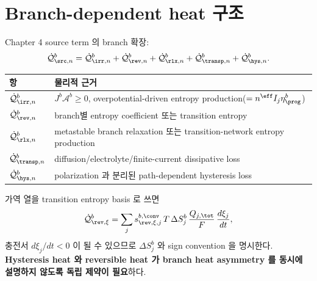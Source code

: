 \section{Branch-dependent heat 구조}\label{sec:ch5_branchheat}
Chapter 4 source term 의 branch 확장:
\begin{equation}
\dot{\mathcal Q}_{\src,n}^b=\dot{\mathcal Q}_{\irr,n}^b+\dot{\mathcal Q}_{\rev,n}^b+\dot{\mathcal Q}_{\rlx,n}^b+\dot{\mathcal Q}_{\transp,n}^b+\dot{\mathcal Q}_{\hys,n}^b.
\label{eq:ch5_branch_heat}
\end{equation}
\begin{longtable}{p{} p{}}
\toprule 항 & 물리적 근거 \\ \midrule \endhead
$\dot{\mathcal Q}_{\irr,n}^b$ & $J^b\mathcal A^b\ge0$, overpotential-driven entropy production($=n^{\eff}I_j\eta_\prog^b$) \\
$\dot{\mathcal Q}_{\rev,n}^b$ & branch별 entropy coefficient 또는 transition entropy \\
$\dot{\mathcal Q}_{\rlx,n}^b$ & metastable branch relaxation 또는 transition-network entropy production \\
$\dot{\mathcal Q}_{\transp,n}^b$ & diffusion/electrolyte/finite-current dissipative loss \\
$\dot{\mathcal Q}_{\hys,n}^b$ & polarization 과 분리된 path-dependent hysteresis loss \\
\bottomrule
\end{longtable}
가역 열을 transition entropy basis 로 쓰면
\begin{equation}
\dot{\mathcal Q}_{\rev,\xi}^b=\sum_j s_{\rev,\xi,j}^{b,\conv}\,T\,\Delta S_j^b\,\frac{Q_{j,\tot}}{F}\,\frac{d\xi_j}{dt},
\label{eq:ch5_branch_rev}
\end{equation}
충전서 $d\xi_j/dt<0$ 이 될 수 있으므로 $\Delta S_j^b$ 와 sign convention 을 명시한다. \textbf{Hysteresis heat
와 reversible heat 가 branch heat asymmetry 를 동시에 설명하지 않도록 독립 제약이 필요}하다.

